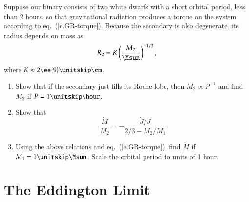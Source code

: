 \begin{exercisebox} Suppose our binary consists of two white dwarfs with a short orbital period, less than 2 hours, so that gravitational radiation produces a torque on the system according to eq.~(\ref{e.GR-torque}).  Because the secondary is also degenerate, its radius depends on mass as
\[ R_{2} = K \left(\frac{M_{2}}{\Msun}\right)^{-1/3}, \]
where $K \approx 2\ee{9}\nsp\cm$.
\begin{enumerate}
\item Show that if the secondary just fills its Roche lobe, then $M_{2} \propto P^{-1}$ and find $M_{2}$ if $P = 1\nsp\hour$.
\item Show that
\[ \frac{\dot{M}}{M_{2}} = - \frac{\dot{J}/J}{2/3 - M_{2}/M_{1}} \]
\item Using the above relations and eq.~(\ref{e.GR-torque}), find $\dot{M}$ if $M_{1} = 1\nsp\Msun$. Scale the orbital period to units of 1 hour.
\end{enumerate}
\end{exercisebox}

\section{The Eddington Limit}

